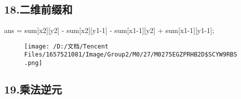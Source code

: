\documentclass[
]{article}
\newenvironment{Shaded}{}{}
\newcommand{\DecValTok}[1]{\textcolor[rgb]{0.25,0.63,0.44}{#1}}
\newcommand{\NormalTok}[1]{#1}
\newcommand{\OperatorTok}[1]{\textcolor[rgb]{0.40,0.40,0.40}{#1}}
\begin{document}
\hypertarget{18ux4e8cux7ef4ux524dux7f00ux548c}{%
\subsection{18.二维前缀和}\label{18ux4e8cux7ef4ux524dux7f00ux548c}}

\begin{Shaded}
\begin{Highlighting}[]
\NormalTok{ans }\OperatorTok{=}\NormalTok{  sum}\OperatorTok{[}\NormalTok{x2}\OperatorTok{][}\NormalTok{y2}\OperatorTok{]} \OperatorTok{{-}}\NormalTok{ sum}\OperatorTok{[}\NormalTok{x2}\OperatorTok{][}\NormalTok{y1}\OperatorTok{{-}}\DecValTok{1}\OperatorTok{]} \OperatorTok{{-}}\NormalTok{ sum}\OperatorTok{[}\NormalTok{x1}\OperatorTok{{-}}\DecValTok{1}\OperatorTok{][}\NormalTok{y2}\OperatorTok{]} \OperatorTok{+}\NormalTok{ sum}\OperatorTok{[}\NormalTok{x1}\OperatorTok{{-}}\DecValTok{1}\OperatorTok{][}\NormalTok{y1}\OperatorTok{{-}}\DecValTok{1}\OperatorTok{];}
\end{Highlighting}
\end{Shaded}

\begin{figure}
\centering
\texttt{[image: /D:/文档/Tencent Files/1657521081/Image/Group2/M0/27/M0275EGZPRHB2D\$SCYW9RBS.png]}
\caption{}
\end{figure}

\hypertarget{19ux4e58ux6cd5ux9006ux5143}{%
\subsection{19.乘法逆元}\label{19ux4e58ux6cd5ux9006ux5143}}
\end{document}
